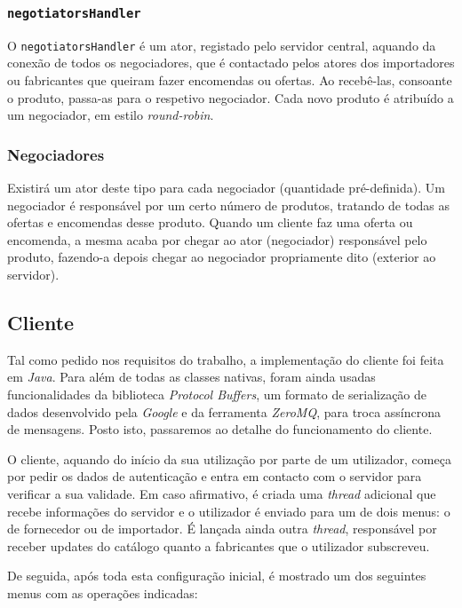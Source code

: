 \documentclass[a4paper]{report}
\begin{document}
	\subsubsection{\texttt{negotiatorsHandler}}
	O \texttt{negotiatorsHandler} é um ator, registado pelo servidor central, aquando da conexão de todos os negociadores, que é contactado pelos atores dos importadores ou fabricantes que queiram fazer encomendas ou ofertas. 
	Ao recebê-las, consoante o produto, passa-as para o respetivo negociador. Cada novo produto é atribuído a um negociador, em estilo \textit{round-robin}.

	\subsubsection{Negociadores}
	Existirá um ator deste tipo para cada negociador (quantidade pré-definida). Um negociador é responsável por um certo número de produtos, tratando de todas as ofertas e encomendas desse produto.
	Quando um cliente faz uma oferta ou encomenda, a mesma acaba por chegar ao ator (negociador) responsável pelo produto, fazendo-a depois chegar ao negociador propriamente dito (exterior ao servidor).

	\subsection{Cliente}
	Tal como pedido nos requisitos do trabalho, a implementação do cliente foi feita em \textit{Java}. Para além de todas as classes nativas, foram ainda usadas funcionalidades da biblioteca \textit{Protocol Buffers}, um formato de serialização de dados desenvolvido pela \textit{Google} e da ferramenta \textit{ZeroMQ}, para troca assíncrona de mensagens. Posto isto, passaremos ao detalhe do funcionamento do cliente.
	
	O cliente, aquando do início da sua utilização por parte de um utilizador, começa por pedir os dados de autenticação e entra em contacto com o servidor para verificar a sua validade. Em caso afirmativo, é criada uma \textit{thread} adicional que recebe informações do servidor e o utilizador é enviado para um de dois menus: o de fornecedor ou de importador. É lançada ainda outra \textit{thread}, responsável por receber updates do catálogo quanto a fabricantes que o utilizador subscreveu.
	
	De seguida, após toda esta configuração inicial, é mostrado um dos seguintes menus com as operações indicadas:
	
\end{document}
